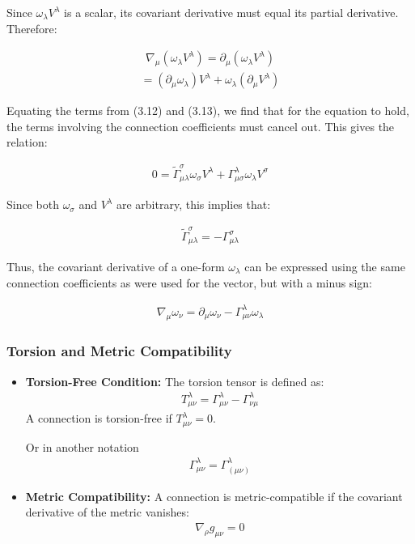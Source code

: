 \documentclass[11pt,letterpaper]{book}
\begin{document}
Since \( \omega_\lambda V^\lambda \) is a scalar, its covariant derivative must equal its partial derivative. Therefore:

\begin{align}
\nabla_\mu (\omega_\lambda V^\lambda) = \partial_\mu (\omega_\lambda V^\lambda)
\end{align}
\begin{align}
= (\partial_\mu \omega_\lambda) V^\lambda + \omega_\lambda (\partial_\mu V^\lambda)
\end{align}

Equating the terms from (3.12) and (3.13), we find that for the equation to hold, the terms involving the connection coefficients must cancel out. This gives the relation:

\begin{align}
0 = \tilde{\Gamma}^\sigma_{\mu\lambda} \omega_\sigma V^\lambda + \Gamma^\lambda_{\mu\sigma} \omega_\lambda V^\sigma
\end{align}

Since both \( \omega_\sigma \) and \( V^\lambda \) are arbitrary, this implies that:

\begin{align}
\tilde{\Gamma}^\sigma_{\mu\lambda} = -\Gamma^\sigma_{\mu\lambda}
\end{align}

Thus, the covariant derivative of a one-form \( \omega_\lambda \) can be expressed using the same connection coefficients as were used for the vector, but with a minus sign:

\begin{align}
\nabla_\mu \omega_\nu = \partial_\mu \omega_\nu - \Gamma^\lambda_{\mu\nu} \omega_\lambda
\end{align}

\subsubsection{Torsion and Metric Compatibility}
\begin{itemize}
  \item \textbf{Torsion-Free Condition:} The torsion tensor is defined as:
  \begin{align}
  T^\lambda_{\mu\nu} = \Gamma^\lambda_{\mu\nu} - \Gamma^\lambda_{\nu\mu}
  \end{align}
  A connection is torsion-free if \(T^\lambda_{\mu\nu} = 0\).

  Or in another notation
  \begin{align}
  \Gamma^{\lambda}_{\mu\nu} = \Gamma^{\lambda}_{(\mu\nu)}
  \end{align}
  \item \textbf{Metric Compatibility:} A connection is metric-compatible if the covariant derivative of the metric vanishes:
  \begin{align}
  \nabla_\rho g_{\mu\nu} = 0
  \end{align}
\end{itemize}
\end{document}

